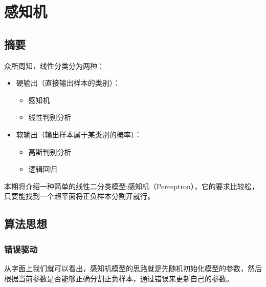 \documentclass{report}
\begin{document}
\chapter{感知机}
\section{摘要}
众所周知，线性分类分为两种：
\begin{itemize}
	\item 硬输出（直接输出样本的类别）：
	\begin{itemize}
	\item 感知机
	\item 线性判别分析
	\end{itemize}
	\item 软输出（输出样本属于某类别的概率）：
	\begin{itemize}
	\item 高斯判别分析
	\item 逻辑回归
	\end{itemize}
\end{itemize}
本期将介绍一种简单的线性二分类模型:感知机（Perceptron），它的要求比较松，只要能找到一个超平面将正负样本分割开就行。
\section{算法思想}
\subsection{错误驱动}
从字面上我们就可以看出，感知机模型的思路就是先随机初始化模型的参数，然后根据当前参数是否能够正确分割正负样本，通过错误来更新自己的参数。
\end{document}
